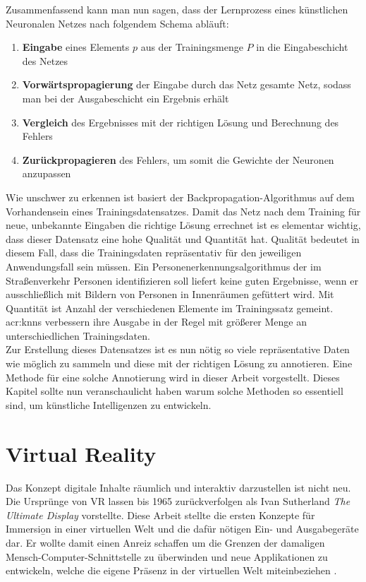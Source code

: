 Zusammenfassend kann man nun sagen, dass der Lernprozess eines künstlichen Neuronalen Netzes nach folgendem Schema abläuft:

\begin{enumerate}
\item \textbf{Eingabe} eines Elements \(p\) aus der Trainingsmenge \(P\) in die Eingabeschicht des Netzes
\item \textbf{Vorwärtspropagierung} der Eingabe durch das Netz gesamte Netz, sodass man bei der Ausgabeschicht ein Ergebnis erhält
\item \textbf{Vergleich} des Ergebnisses mit der richtigen Lösung und Berechnung des Fehlers
\item \textbf{Zurückpropagieren} des Fehlers, um somit die Gewichte der Neuronen anzupassen
\end{enumerate}

Wie unschwer zu erkennen ist basiert der Backpropagation-Algorithmus auf dem Vorhandensein eines Trainingsdatensatzes. Damit das Netz nach dem Training für neue, unbekannte Eingaben die richtige Lösung errechnet ist es elementar wichtig, dass dieser Datensatz eine hohe Qualität und Quantität hat. Qualität bedeutet in diesem Fall, dass die Trainingsdaten repräsentativ für den jeweiligen Anwendungsfall sein müssen. Ein Personenerkennungsalgorithmus der im Straßenverkehr Personen identifizieren soll liefert keine guten Ergebnisse, wenn er ausschließlich mit Bildern von Personen in Innenräumen gefüttert wird. Mit Quantität ist Anzahl der verschiedenen Elemente im Trainingssatz gemeint. \acrshort{acr:knn}s verbessern ihre Ausgabe in der Regel mit größerer Menge an unterschiedlichen Trainingsdaten.\\

Zur Erstellung dieses Datensatzes ist es nun nötig so viele repräsentative Daten wie möglich zu sammeln und diese mit der richtigen Lösung zu annotieren. Eine Methode für eine solche Annotierung wird in dieser Arbeit vorgestellt. Dieses Kapitel sollte nun veranschaulicht haben warum  solche Methoden so essentiell sind, um künstliche Intelligenzen zu entwickeln.


\section{Virtual Reality}
\label{sec:VirtualReality}

Das Konzept digitale Inhalte räumlich und interaktiv darzustellen ist nicht neu. Die Ursprünge von VR lassen bis 1965 zurückverfolgen als Ivan Sutherland \glqq \textit{The Ultimate Display}\grqq \cite{bib:UltimateDisplay} vorstellte. Diese Arbeit stellte die ersten Konzepte für Immersio̱n in einer virtuellen Welt und die dafür nötigen Ein- und Ausgabegeräte dar. Er wollte damit einen Anreiz schaffen um die Grenzen der damaligen Mensch-Computer-Schnittstelle zu überwinden und neue Applikationen zu entwickeln, welche die eigene Präsenz in der virtuellen Welt miteinbeziehen \cite{bib:VRReport}.\\


